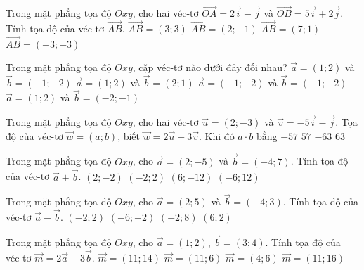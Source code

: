 \begin{ex}%
	Trong mặt phẳng tọa độ $Oxy$, cho hai véc-tơ $\vec{OA} =2\vec{i} -\vec{j}$ và $\vec{OB} =5\vec{i} +2\vec{j}$. Tính tọa độ của véc-tơ $\vec{AB}$.
	\choice
	{\True $\vec{AB} =(3;3)$}
	{$\vec{AB} =(2;-1) $}
	{$\vec{AB} =(7;1)$}
	{$\vec{AB} =(-3;-3) $}
\end{ex}

\begin{ex}%
	Trong mặt phẳng tọa độ $Oxy$, cặp véc-tơ nào dưới đây đối nhau?
	\choice
	{\True $\vec{a} =(1;2)$ và $\vec{b} =(-1;-2)$}
	{$\vec{a} =(1;2)$ và $\vec{b} =(2;1)$}
	{$\vec{a} =(-1;-2)$ và $\vec{b} =(-1;-2)$}
	{$\vec{a} =(1;2)$ và $\vec{b} =(-2;-1)$}
\end{ex}

\begin{ex}%
	Trong mặt phẳng tọa độ $Oxy$, cho hai véc-tơ $\vec{u} =(2;-3)$ và $\vec{v} =-5\vec{i}-\vec{j}$. Tọa độ của véc-tơ $\vec{w} =(a;b)$, biết $\vec{w} =2\vec{u} -3\vec{v}$. Khi đó $a\cdot b$ bằng
	\choice
	{\True $-57$}
	{$57$}
	{$-63$}
	{$63$}
\end{ex}

\begin{ex}%
	Trong mặt phẳng tọa độ $Oxy$, cho $\vec{a}=(2;-5)$ và $\vec{b}=(-4;7)$. Tính tọa độ của véc-tơ $\vec{a}+\vec{b}$.
	\choice
	{$(2;-2)$}
	{\True $(-2;2)$}
	{$(6;-12)$}
	{$(-6;12)$}
\end{ex}

\begin{ex}%
	Trong mặt phẳng tọa độ $Oxy$, cho $\vec{a}=(2;5)$ và $\vec{b}=(-4;3)$. Tính tọa độ của véc-tơ $\vec{a}-\vec{b}$.
	\choice
	{$(-2;2)$}
	{$(-6;-2)$}
	{$(-2;8)$}
	{\True $(6;2)$}
\end{ex}

\begin{ex}%
	Trong mặt phẳng tọa độ $Oxy$, cho $\vec{a}=(1;2)$, $\vec{b}=(3;4)$. Tính tọa độ của véc-tơ $\vec{m}=2\vec{a}+3\vec{b}$.
	\choice
	{$\vec{m}=(11;14)$}
	{$\vec{m}=(11;6)$}
	{$\vec{m}=(4;6)$}
	{\True $\vec{m}=(11;16)$}
\end{ex}

